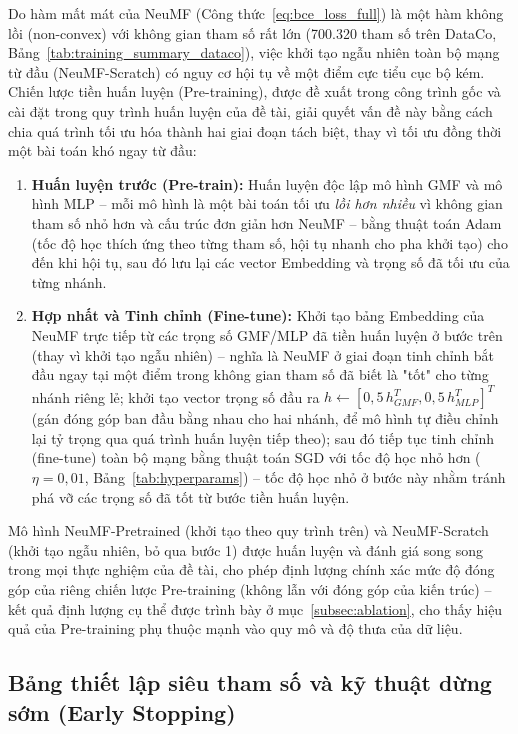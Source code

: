 Do hàm mất mát của NeuMF (Công thức~\eqref{eq:bce_loss_full}) là một hàm không lồi (non-convex) với không gian tham số rất lớn (700.320 tham số trên DataCo, Bảng~\ref{tab:training_summary_dataco}), việc khởi tạo ngẫu nhiên toàn bộ mạng từ đầu (NeuMF-Scratch) có nguy cơ hội tụ về một điểm cực tiểu cục bộ kém. Chiến lược tiền huấn luyện (Pre-training), được đề xuất trong công trình gốc \parencite{he2017ncf} và cài đặt trong quy trình huấn luyện của đề tài, giải quyết vấn đề này bằng cách chia quá trình tối ưu hóa thành hai giai đoạn tách biệt, thay vì tối ưu đồng thời một bài toán khó ngay từ đầu:
\begin{enumerate}
    \item \textbf{Huấn luyện trước (Pre-train):} Huấn luyện độc lập mô hình GMF và mô hình MLP -- mỗi mô hình là một bài toán tối ưu \emph{lồi hơn nhiều} vì không gian tham số nhỏ hơn và cấu trúc đơn giản hơn NeuMF -- bằng thuật toán Adam \parencite{kingma2014adam} (tốc độ học thích ứng theo từng tham số, hội tụ nhanh cho pha khởi tạo) cho đến khi hội tụ, sau đó lưu lại các vector Embedding và trọng số đã tối ưu của từng nhánh.
    \item \textbf{Hợp nhất và Tinh chỉnh (Fine-tune):} Khởi tạo bảng Embedding của NeuMF trực tiếp từ các trọng số GMF/MLP đã tiền huấn luyện ở bước trên (thay vì khởi tạo ngẫu nhiên) -- nghĩa là NeuMF ở giai đoạn tinh chỉnh bắt đầu ngay tại một điểm trong không gian tham số đã biết là "tốt" cho từng nhánh riêng lẻ; khởi tạo vector trọng số đầu ra $h \leftarrow [0{,}5\, h_{GMF}^T, 0{,}5\, h_{MLP}^T]^T$ (gán đóng góp ban đầu bằng nhau cho hai nhánh, để mô hình tự điều chỉnh lại tỷ trọng qua quá trình huấn luyện tiếp theo); sau đó tiếp tục tinh chỉnh (fine-tune) toàn bộ mạng bằng thuật toán SGD với tốc độ học nhỏ hơn ($\eta=0{,}01$, Bảng~\ref{tab:hyperparams}) -- tốc độ học nhỏ ở bước này nhằm tránh phá vỡ các trọng số đã tốt từ bước tiền huấn luyện.
\end{enumerate}
Mô hình NeuMF-Pretrained (khởi tạo theo quy trình trên) và NeuMF-Scratch (khởi tạo ngẫu nhiên, bỏ qua bước 1) được huấn luyện và đánh giá song song trong mọi thực nghiệm của đề tài, cho phép định lượng chính xác mức độ đóng góp của riêng chiến lược Pre-training (không lẫn với đóng góp của kiến trúc) -- kết quả định lượng cụ thể được trình bày ở mục~\ref{subsec:ablation}, cho thấy hiệu quả của Pre-training phụ thuộc mạnh vào quy mô và độ thưa của dữ liệu.

\subsection{Bảng thiết lập siêu tham số và kỹ thuật dừng sớm (Early Stopping)}
\label{subsec:hyperparameters_setup}


